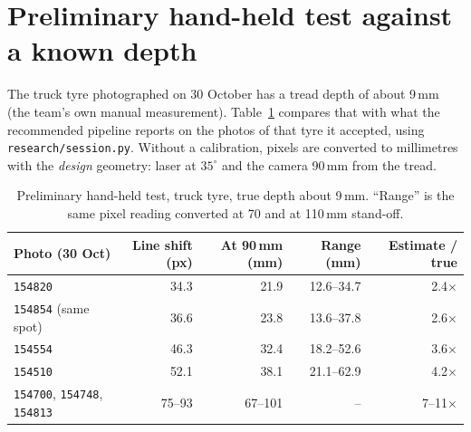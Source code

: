 \section{Preliminary hand-held test against a known depth}\label{sec:prelim}


The truck tyre photographed on 30 October has a tread depth of about 9\,mm (the team's own manual measurement).
Table~\ref{tab:prelim} compares that with what the recommended pipeline reports on the photos of that tyre it
accepted, using \texttt{research/session.py}. Without a calibration, pixels are converted to millimetres with the
\emph{design} geometry: laser at $35^\circ$ and the camera 90\,mm from the tread.

\begin{table}[H]
\centering\small
\caption{Preliminary hand-held test, truck tyre, true depth about 9\,mm. ``Range'' is the same pixel reading
converted at 70 and at 110\,mm stand-off.}\label{tab:prelim}
\begin{tabular}{@{}lrrrr@{}}
\toprule
Photo (30 Oct) & Line shift (px) & At 90\,mm (mm) & Range (mm) & Estimate / true \\
\midrule
\texttt{154820} & 34.3 & 21.9 & 12.6--34.7 & 2.4$\times$ \\
\texttt{154854} (same spot) & 36.6 & 23.8 & 13.6--37.8 & 2.6$\times$ \\
\texttt{154554} & 46.3 & 32.4 & 18.2--52.6 & 3.6$\times$ \\
\texttt{154510} & 52.1 & 38.1 & 21.1--62.9 & 4.2$\times$ \\
\midrule
\texttt{154700}, \texttt{154748}, \texttt{154813} & 75--93 & 67--101 & -- & 7--11$\times$ \\
\bottomrule
\end{tabular}
\end{table}

